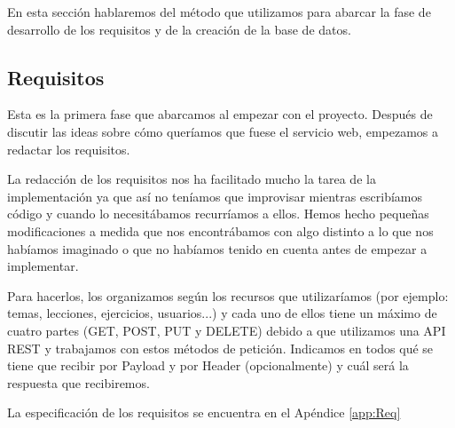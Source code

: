 En esta sección hablaremos del método que utilizamos para abarcar la fase de desarrollo de los requisitos y de la creación de la base de datos.

\subsection{Requisitos}
Esta es la primera fase que abarcamos al empezar con el proyecto. Después de discutir las ideas sobre cómo queríamos que fuese el servicio web, empezamos a redactar los requisitos.
\vspace{1em}

La redacción de los requisitos nos ha facilitado mucho la tarea de la implementación ya que así no teníamos que improvisar mientras escribíamos código y cuando lo necesitábamos recurríamos a ellos.
Hemos hecho pequeñas modificaciones a medida que nos encontrábamos con algo distinto a lo que nos habíamos imaginado o que no habíamos tenido en cuenta antes de empezar a implementar.
\vspace{1em}

Para hacerlos, los organizamos según los recursos que utilizaríamos (por ejemplo: temas, lecciones, ejercicios, usuarios...) y cada uno de ellos tiene un máximo de cuatro partes (GET, POST, PUT y DELETE) debido a que utilizamos una API REST y trabajamos con estos métodos de petición. Indicamos en todos qué se tiene que recibir por Payload y por Header (opcionalmente) y cuál será la respuesta que recibiremos.
\vspace{1em}

La especificación de los requisitos se encuentra en el Apéndice \ref{app:Req}

